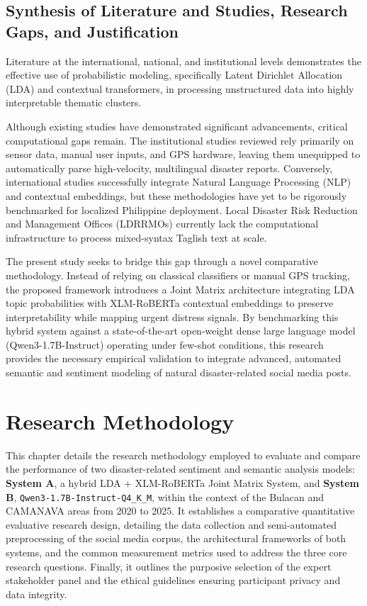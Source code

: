 \documentclass[12pt,a4paper]{report}
\newcommand{\sysA}{\textbf{System A}}
\newcommand{\sysB}{\textbf{System B}}
\newcommand{\qwen}{\texttt{Qwen3-1.7B-Instruct-Q4\_K\_M}}
\newcommand{\xlmr}{XLM-RoBERTa}
\begin{document}
\section{Synthesis of Literature and Studies, Research Gaps, and Justification}

Literature at the international, national, and institutional levels
demonstrates the effective use of probabilistic modeling, specifically Latent
Dirichlet Allocation (LDA) and contextual transformers, in processing
unstructured data into highly interpretable thematic clusters.

Although existing studies have demonstrated significant advancements, critical
computational gaps remain. The institutional studies reviewed rely primarily on
sensor data, manual user inputs, and GPS hardware, leaving them unequipped to
automatically parse high-velocity, multilingual disaster reports. Conversely,
international studies successfully integrate Natural Language Processing (NLP)
and contextual embeddings, but these methodologies have yet to be rigorously
benchmarked for localized Philippine deployment. Local Disaster Risk Reduction
and Management Offices (LDRRMOs) currently lack the computational
infrastructure to process mixed-syntax Taglish text at scale.

The present study seeks to bridge this gap through a novel comparative
methodology. Instead of relying on classical classifiers or manual GPS
tracking, the proposed framework introduces a Joint Matrix architecture
integrating LDA topic probabilities with \xlmr{} contextual embeddings to
preserve interpretability while mapping urgent distress signals. By benchmarking
this hybrid system against a state-of-the-art open-weight dense large language
model (Qwen3-1.7B-Instruct) operating under few-shot conditions, this research
provides the necessary empirical validation to integrate advanced, automated
semantic and sentiment modeling of natural disaster-related social media posts.

\chapter{Research Methodology}

This chapter details the research methodology employed to evaluate and compare
the performance of two disaster-related sentiment and semantic analysis models:
\sysA, a hybrid LDA + \xlmr{} Joint Matrix System, and \sysB, \qwen, within
the context of the Bulacan and CAMANAVA areas from 2020 to 2025. It establishes
a comparative quantitative evaluative research design, detailing the data
collection and semi-automated preprocessing of the social media corpus, the
architectural frameworks of both systems, and the common measurement metrics
used to address the three core research questions. Finally, it outlines the
purposive selection of the expert stakeholder panel and the ethical guidelines
ensuring participant privacy and data integrity.
\end{document}
